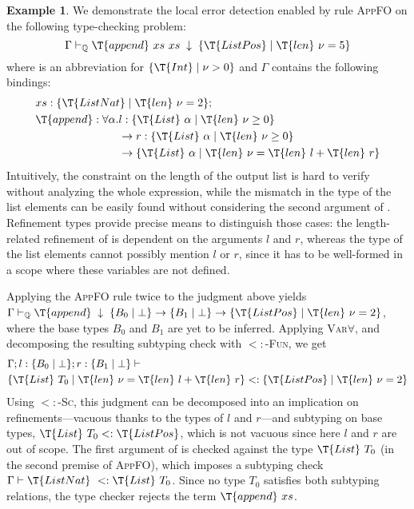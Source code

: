 \documentclass[10pt,preprint]{sigplanconf-pldi16}
\theoremstyle{definition}
\newtheorem*{example*}{Example}
\newcommand{\Subt}{<:}
\newcommand{\App}[2]{{#1}\ {#2}}
\newcommand{\env}{\Gamma}
\newcommand{\consume}{\;\downarrow\;}
\newcommand{\quals}{\mathbb{Q}}
\newcommand{\entailsQ}{\vdash_{\quals}}
\begin{document}
\begin{example*}
We demonstrate the local error detection enabled by rule \textsc{AppFO}
on the following type-checking problem:
$$
\env\entailsQ \App{\App{\T{append}}{xs}}{xs} \consume \{\T{List Pos}\mid \App{\T{len}}{\nu} = 5\}
$$
where  is an abbreviation for $\{\T{Int}\mid\nu > 0\}$
and $\env$ contains the following bindings:
\begin{align*}
&xs: \{\T{List Nat}\mid \App{\T{len}}{\nu} = 2\};\\
&\T{append}: \forall\alpha . 
              \begin{aligned}[t]
              &l : \{\T{List}\  \alpha\mid \App{\T{len}}{\nu} \geq 0\} \\
              &\to r : \{\T{List}\  \alpha\mid \App{\T{len}}{\nu} \geq 0\}\\ 
              &\to \{\T{List}\  \alpha\mid \App{\T{len}}{\nu}=\App{\T{len}}{l} + \App{\T{len}}{r}\}
             \end{aligned}
\end{align*}
Intuitively, the constraint on the length of the output list is hard to verify without analyzing the whole expression,
while the mismatch in the type of the list elements can be easily found without considering the second argument of .
Refinement types provide precise means to distinguish those cases:
the length-related refinement of  is dependent on the arguments $l$ and $r$,
whereas the type of the list elements cannot possibly mention $l$ or $r$,
since it has to be well-formed in a scope where these variables are not defined.

Applying the \textsc{AppFO} rule twice to the judgment above yields
$\env\entailsQ\T{append}\consume \{B_0\mid\bot\} \to \{B_1\mid\bot\} \to \{\T{List Pos}\mid \T{len}\ \nu = 2\}$,
where the base types $B_0$ and $B_1$ are yet to be inferred.
Applying \textsc{Var$\forall$}, and decomposing the resulting subtyping check with \textsc{$\Subt$-Fun}, we get
\begin{align*}
&\env;l: \{B_0\mid\bot\};r: \{B_1\mid\bot\} \vdash\\
&\{\T{List}\  T_0\mid \App{\T{len}}{\nu}=\App{\T{len}}{l} + \App{\T{len}}{r}\} \Subt \{\T{List Pos}\mid \T{len}\ \nu = 2\}
\end{align*}
Using \textsc{$\Subt$-Sc}, this judgment can be decomposed into an implication on refinements---vacuous thanks to the types of $l$ and $r$---and subtyping on base types, $\T{List}\  T_0 \Subt \T{List Pos}$,
which is not vacuous since here $l$ and $r$ are out of scope.
The first argument of  is checked against the type $\T{List}\  T_0$ (in the second premise of \textsc{AppFO}),
which imposes a subtyping check $\env\vdash \T{List Nat}\  \Subt \T{List}\  T_0$.
Since no type $T_0$ satisfies both subtyping relations,
the type checker rejects the term $\T{append}\ xs$.
\end{example*}
\end{document}
